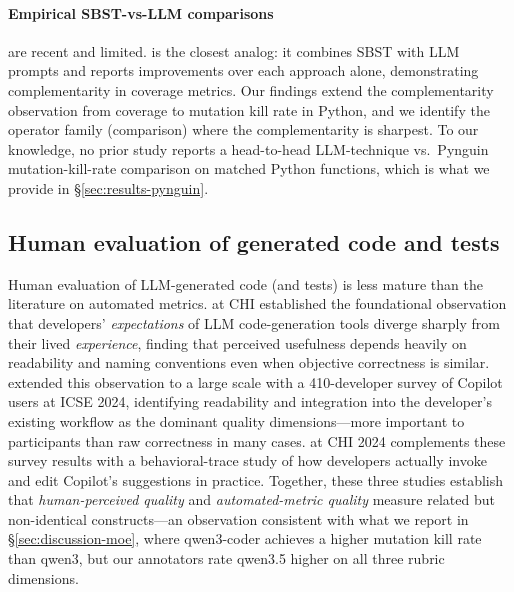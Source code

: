 \documentclass[smallextended]{svjour3}
\begin{document}
\paragraph{Empirical SBST-vs-LLM comparisons}
are recent and limited. \citet{lemieux2023codamosa} is the closest
analog: it combines SBST with LLM prompts and reports improvements
over each approach alone, demonstrating complementarity in coverage
metrics. Our findings extend the complementarity
observation from coverage to mutation kill rate in Python, and we
identify the operator family (comparison) where the complementarity
is sharpest. To our knowledge, no prior study reports a head-to-head
LLM-technique vs.\ Pynguin mutation-kill-rate comparison on matched
Python functions, which is what we provide in
\S\ref{sec:results-pynguin}.

\subsection{Human evaluation of generated code and
 tests}\label{sec:related-humaneval}
 
 Human evaluation of LLM-generated code (and tests) is less mature
 than the literature on automated metrics. \citet{vaithilingam2022}
 at CHI established the foundational observation that developers'
 \emph{expectations} of LLM code-generation tools diverge sharply
 from their lived \emph{experience}, finding that perceived
 usefulness depends heavily on readability and naming conventions
 even when objective correctness is similar. \citet{liang2024copilot}
 extended this observation to a large scale with a 410-developer survey
 of Copilot users at ICSE 2024, identifying readability and integration
 into the developer's existing workflow as the dominant
 quality dimensions—more important to participants than raw
 correctness in many cases. \citet{mozannar2024chi} at CHI 2024
 complements these survey results with a behavioral-trace study of
 how developers actually invoke and edit Copilot's suggestions in
 practice. Together, these three studies establish that
 \emph{human-perceived quality} and \emph{automated-metric quality}
 measure related but non-identical constructs—an observation
 consistent with what we report in
 \S\ref{sec:discussion-moe}, where qwen3-coder achieves a higher
 mutation kill rate than qwen3, but our annotators rate qwen3.5
 higher on all three rubric dimensions.
 
\end{document}
